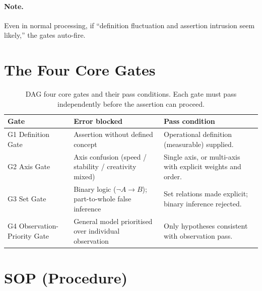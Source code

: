 \paragraph{Note.}
Even in normal processing, if ``definition fluctuation and assertion
intrusion seem likely,'' the gates auto-fire.

\section{The Four Core Gates}
\label{sec:dag-four-core-gates}

\begin{table}[ht]
\centering
\small
\begin{tabularx}{\linewidth}{lXX}
\toprule
\textbf{Gate} & \textbf{Error blocked} & \textbf{Pass condition} \\
\midrule

G1 Definition Gate
& Assertion without defined concept
& Operational definition (measurable) supplied. \\

G2 Axis Gate
& Axis confusion (speed / stability / creativity mixed)
& Single axis, or multi-axis with explicit weights and order. \\

G3 Set Gate
& Binary logic ($\neg A \to B$); part-to-whole false inference
& Set relations made explicit; binary inference rejected. \\

G4 Observation-Priority Gate
& General model prioritised over individual observation
& Only hypotheses consistent with observation pass. \\

\bottomrule
\end{tabularx}
\caption[DAG four core gates]{DAG four core gates and their pass
conditions. Each gate must pass independently before the assertion
can proceed.}
\label{tab:dag-gates}
\end{table}

\section{SOP (Procedure)}
\label{sec:dag-sop}

